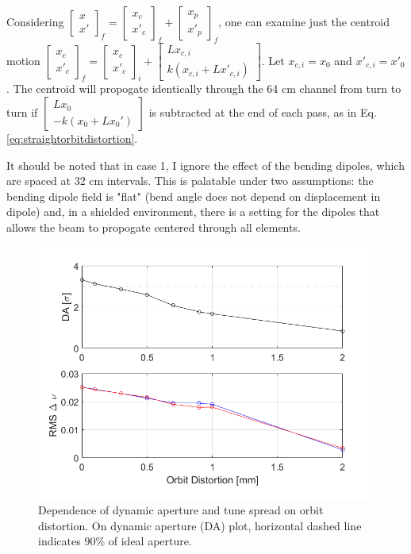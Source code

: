 Considering $\begin{bmatrix} x \\ x' \end{bmatrix}_f = \begin{bmatrix} x_c \\ x'_c \end{bmatrix}_f + \begin{bmatrix} x_p \\ x'_p \end{bmatrix}_f$, one can examine just the centroid motion $\begin{bmatrix} x_c \\ x'_c \end{bmatrix}_f = \begin{bmatrix} x_c \\ x'_c \end{bmatrix}_i + \begin{bmatrix} L x_{c,i} \\ k(x_{c,i} + Lx'_{c,i}) \end{bmatrix}$. Let $x_{c,i} = x_0$ and $x'_{c,i} = x'_0$. The centroid will propogate identically through the 64 cm channel from turn to turn if $\begin{bmatrix} L x_0 \\ -k(x_0 + Lx_0') \end{bmatrix}$ is subtracted at the end of each pass, as in Eq. \ref{eq:straightorbitdistortion}.

It should be noted that in case 1, I ignore the effect of the bending dipoles, which are spaced at 32 cm intervals. This is palatable under two assumptions: the bending dipole field is "flat" (bend angle does not depend on displacement in dipole) and, in a shielded environment, there is a setting for the dipoles that allows the beam to propogate centered through all elements. 

\begin{figure}
\centering
\includegraphics[width=0.8 \textwidth]{7.figures/steeringtolerance/DA_deltanu_plots_vs_orbit_distortion.png}
\caption{Dependence of dynamic aperture and tune spread on orbit distortion. On dynamic aperture (DA) plot, horizontal dashed line indicates $90\%$ of ideal aperture.}
\label{fig:DAvsorbitdistort}
\end{figure}

